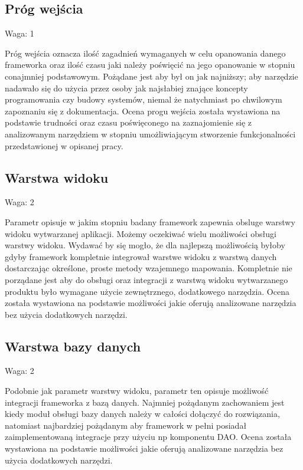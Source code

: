 \documentclass[12pt]{report}
\begin{document}
    \subsection{Próg wejścia}
      \begin{description}
        \item Waga: 1
      \end{description}
      Próg wejścia oznacza ilość zagadnień wymaganych w celu opanowania danego frameworka oraz ilość czasu jaki należy poświęcić na jego opanowanie w stopniu conajmniej podstawowym.
      Pożądane jest aby był on jak najniższy; aby narzędzie nadawało się do użycia przez osoby jak najsłabiej znające koncepty programowania czy budowy systemów, niemal że natychmiast po chwilowym zapoznaniu się z dokumentacja.
      Ocena progu wejścia została wystawiona na podstawie trudności oraz czasu poświęconego na zaznajomienie się z analizowanym narzędziem w stopniu umożliwiającym stworzenie funkcjonalności przedstawionej w opisanej pracy.

    \subsection{Warstwa widoku}
      \begin{description}
        \item Waga: 2
      \end{description}
      Parametr opisuje w jakim stopniu badany framework zapewnia obsluge warstwy widoku wytwarzanej aplikacji.
      Możemy oczekiwać wielu możliwości obsługi warstwy widoku.
      Wydawać by się mogło, że dla najlepszą możliwością byłoby gdyby framework kompletnie integrował warstwe widoku z warstwą danych dostarczając określone, proste metody wzajemnego mapowania.
      Kompletnie nie porządane jest aby do obsługi oraz integracji z warstwą widoku wytwarzanego produktu było wymagane użycie zewnętrznego, dodatkowego narzędzia.
      Ocena została wystawiona na podstawie możliwości jakie oferują analizowane narzędzia bez użycia dodatkowych narzędzi.

    \subsection{Warstwa bazy danych}
      \begin{description}
        \item Waga: 2
      \end{description}
      Podobnie jak parametr warstwy widoku, parametr ten opisuje możliwość integracji frameworka z bazą danych.
      Najmniej pożądanym zachowaniem jest kiedy moduł obsługi bazy danych należy w całości dołączyć do rozwiązania, natomiast najbardziej pożądanym aby framework w pełni posiadał zaimplementowaną integracje przy użyciu np komponentu DAO.
      Ocena została wystawiona na podstawie możliwości jakie oferują analizowane narzędzia bez użycia dodatkowych narzędzi.
\end{document}
